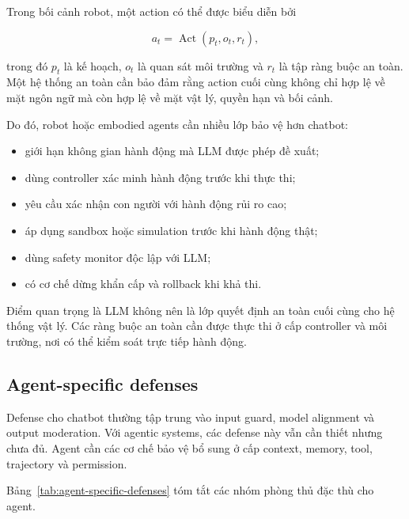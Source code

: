 Trong bối cảnh robot, một action có thể được biểu diễn bởi

\begin{equation}
    a_t =
    \operatorname{Act}(p_t, o_t, r_t),
    \label{eq:robot-action}
\end{equation}

trong đó $p_t$ là kế hoạch, $o_t$ là quan sát môi trường và $r_t$ là tập
ràng buộc an toàn. Một hệ thống an toàn cần bảo đảm rằng action cuối cùng
không chỉ hợp lệ về mặt ngôn ngữ mà còn hợp lệ về mặt vật lý, quyền hạn và
bối cảnh.

Do đó, robot hoặc embodied agents cần nhiều lớp bảo vệ hơn chatbot:

\begin{itemize}[leftmargin=1.2cm]
    \item giới hạn không gian hành động mà LLM được phép đề xuất;
    \item dùng controller xác minh hành động trước khi thực thi;
    \item yêu cầu xác nhận con người với hành động rủi ro cao;
    \item áp dụng sandbox hoặc simulation trước khi hành động thật;
    \item dùng safety monitor độc lập với LLM;
    \item có cơ chế dừng khẩn cấp và rollback khi khả thi.
\end{itemize}

Điểm quan trọng là LLM không nên là lớp quyết định an toàn cuối cùng cho
hệ thống vật lý. Các ràng buộc an toàn cần được thực thi ở cấp controller
và môi trường, nơi có thể kiểm soát trực tiếp hành động.

\subsection{Agent-specific defenses}
\label{subsec:agent-specific-defenses}

Defense cho chatbot thường tập trung vào input guard, model alignment và
output moderation. Với agentic systems, các defense này vẫn cần thiết nhưng
chưa đủ. Agent cần các cơ chế bảo vệ bổ sung ở cấp context, memory, tool,
trajectory và permission.

Bảng~\ref{tab:agent-specific-defenses} tóm tắt các nhóm phòng thủ đặc thù
cho agent.

